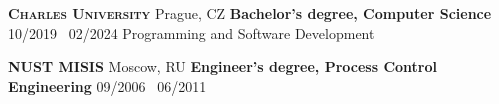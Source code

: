 
\vspace{1.0em}

\textsc{\textbf{Charles University}} \textsuperscript{\href{https://www.mff.cuni.cz/}{\faExternalLink*}}
\hfill Prague, CZ \newline
\textbf{Bachelor's degree, Computer Science}
\hfill 10/2019 \textendash\ 02/2024 \newline
Programming and Software Development

\vspace{1.0em}

\textsc{\textbf{NUST MISIS}} \textsuperscript{\href{https://www.misis.ru/}{\faExternalLink*}}
\hfill Moscow, RU \newline
\textbf{Engineer's degree, Process Control Engineering}
\hfill 09/2006 \textendash\ 06/2011

\vspace{1.0em}
